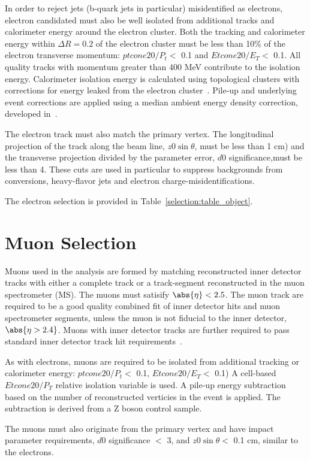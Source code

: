 In order to reject jets (b-quark jets in particular) misidentified as electrons,
electron candidated  must also be well isolated from additional tracks and
calorimeter energy around the electron cluster. Both the tracking 
and calorimeter energy within $\Delta R=0.2$ of the electron
cluster must be less than 10\% of the electron transverse momentum: $ptcone20/P_t <$ 0.1 and $Etcone20/E_T <$ 0.1.
All quality tracks with momentum greater than 400 MeV contribute to the isolation
energy.  Calorimeter isolation energy is calculated
using topological clusters with corrections for energy leaked from the
electron cluster~\cite{Topo}. Pile-up and underlying event corrections are applied using
a median ambient energy density correction, developed in~\cite{PileupCorrections}. 

The electron track must also match the primary vertex. The longitudinal projection 
of the track along the beam line, $z0\sin{\theta}$, must be less than 1 cm) and the transverse projection divided by the
parameter error, $d0$ significance,must be less than 4. These cuts are used in particular to suppress backgrounds
from conversions, heavy-flavor jets and electron charge-misidentifications. 


The electron selection is provided in Table~\ref{selection:table_object}. 


\section{Muon Selection}

Muons used in the analysis are formed by matching reconstructed inner detector
tracks with either a complete track or a track-segment reconstructed in the muon spectrometer (MS).
The muons must satisify $\abs{\eta} < 2.5$.
The muon track are required to be a good quality combined fit of inner detector hits and muon
spectrometer segments, unless the muon is not fiducial to the
inner detector, $\abs{\eta > 2.4}$.  Muons with inner detector tracks are further required
to pass standard inner detector track hit requirements~\cite{MCP2012}.  

As with electrons, muons are required to be isolated from 
additional tracking or calorimeter energy: $ptcone20/P_t <$ 0.1, $Etcone20/E_T <$ 0.1) A cell-based $Etcone20/P_T$ relative
isolation variable is used. A pile-up energy subtraction based 
on the number of reconstructed verticies in the event is applied. The
subtraction is derived from a Z boson control sample.


The muons must also originate from the primary vertex and have impact parameter requirements, $d0$ significance $<$ 3, and $z0\sin{\theta} <$ 0.1 cm, similar to the electrons. 


